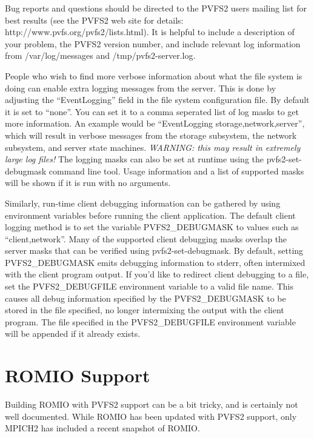 \documentclass[11pt, letterpaper]{article}
\begin{document}
Bug reports and questions should be directed to the PVFS2 users
mailing list for best results (see the PVFS2 web site for details:
http://www.pvfs.org/pvfs2/lists.html).  It is helpful to include a
description of your problem, the PVFS2 version number, and include
relevant log information from /var/log/messages and
/tmp/pvfs2-server.log.

People who wish to find more verbose information about what the file
system is doing can enable extra logging messages from the server.
This is done by adjusting the ``EventLogging'' field in the file
system configuration file.  By default it is set to ``none''.  You can
set it to a comma seperated list of log masks to get more information.
An example would be ``EventLogging storage,network,server'', which
will result in verbose messages from the storage subsystem, the
network subsystem, and server state machines.  \emph{WARNING: this may
result in extremely large log files!}  The logging masks can also be
set at runtime using the pvfs2-set-debugmask command line tool.  Usage
information and a list of supported masks will be shown if it is run
with no arguments.

Similarly, run-time client debugging information can be gathered by
using environment variables before running the client application.
The default client logging method is to set the variable
PVFS2\_DEBUGMASK to values such as ``client,network''.  Many of the
supported client debugging masks overlap the server masks that can be
verified using pvfs2-set-debugmask.  By default, setting
PVFS2\_DEBUGMASK emits debugging information to stderr, often
intermixed with the client program output.  If you'd like to redirect
client debugging to a file, set the PVFS2\_DEBUGFILE environment
variable to a valid file name.  This causes all debug information
specified by the PVFS2\_DEBUGMASK to be stored in the file specified,
no longer intermixing the output with the client program.  The file
specified in the PVFS2\_DEBUGFILE environment variable will be
appended if it already exists.

\section{ROMIO Support}
\label{sec:romio}

Building ROMIO with PVFS2 support can be a bit tricky, and is certainly
not well documented.  While ROMIO has been updated with PVFS2 support,
only MPICH2 has included a recent snapshot of ROMIO.  
\end{document}
